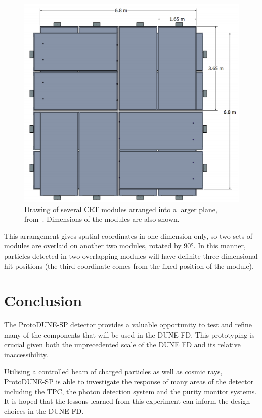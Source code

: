 \begin{figure}[h]
	\centering
	\includegraphics[width=.6\linewidth]{files/figures/protodune_detector/crtModules}
	\caption[Drawing of several CRT modules arranged into a larger plane.]{Drawing of several CRT modules arranged into a larger plane, from~\cite{protodunePerformance}. Dimensions of the modules are also shown.}
	\label{fig:crtModules}
\end{figure}

This arrangement gives spatial coordinates in one dimension only, so two sets of modules are overlaid on another two modules, rotated by \ang{90}. 
In this manner, particles detected in two overlapping modules will have definite three dimensional hit positions (the third coordinate comes from the fixed position of the module).

\section{Conclusion}

The ProtoDUNE-SP detector provides a valuable opportunity to test and refine many of the components that will be used in the DUNE FD.
This prototyping is crucial given both the unprecedented scale of the DUNE FD and its relative inaccessibility. 

Utilising a controlled beam of charged particles as well as cosmic rays, ProtoDUNE-SP is able to investigate the response of many areas of the detector including the TPC, the photon detection system and the purity monitor systems.
It is hoped that the lessons learned from this experiment can inform the design choices in the DUNE FD.
